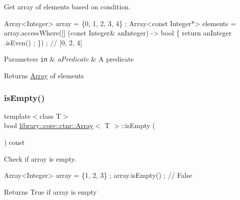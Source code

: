 Get array of elements based on condition. 


\begin{DoxyCode}
Array<Integer> array = \{0, 1, 2, 3, 4\} ;
Array<const Integer*> elements = array.accessWhere([] (\textcolor{keyword}{const} Integer& anInteger) -> \textcolor{keywordtype}{bool} \{ \textcolor{keywordflow}{return} anInteger
      .isEven() ; \}) ; \textcolor{comment}{// [0, 2, 4]}
\end{DoxyCode}



\begin{DoxyParams}[1]{Parameters}
\mbox{\tt in}  & {\em a\+Predicate} & A predicate \\
\hline
\end{DoxyParams}
\begin{DoxyReturn}{Returns}
\hyperlink{classlibrary_1_1core_1_1ctnr_1_1_array}{Array} of elements 
\end{DoxyReturn}
\mbox{\label{classlibrary_1_1core_1_1ctnr_1_1_array_a77d943be46a6d0313be3f2c5ca66d231}} 
\subsubsection{\texorpdfstring{is\+Empty()}{isEmpty()}}
{\footnotesize\ttfamily template$<$class T$>$ \\
bool \hyperlink{classlibrary_1_1core_1_1ctnr_1_1_array}{library\+::core\+::ctnr\+::\+Array}$<$ T $>$\+::is\+Empty (\begin{DoxyParamCaption}{ }\end{DoxyParamCaption}) const}



Check if array is empty. 


\begin{DoxyCode}
Array<Integer> array = \{1, 2, 3\} ;
array.isEmpty() ; \textcolor{comment}{// False}
\end{DoxyCode}


\begin{DoxyReturn}{Returns}
True if array is empty 
\end{DoxyReturn}
\mbox{\label{classlibrary_1_1core_1_1ctnr_1_1_array_abe72cec38e65761df3eaddcfa9b7a44a}} 
